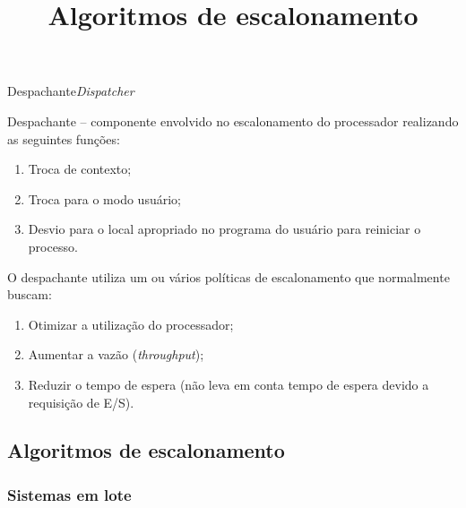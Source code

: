 \begin{frame}{Despachante}{\em Dispatcher}

{ 
Despachante -- componente envolvido no escalonamento do processador
realizando as seguintes funções:
\begin{enumerate}
 \item Troca de contexto;
\item Troca para o modo usuário;
\item Desvio para o local apropriado no programa do usuário para
  reiniciar o processo.
\end{enumerate}
}

O despachante utiliza um ou vários \alert{políticas de escalonamento}
que normalmente buscam:

\begin{enumerate}
\item Otimizar a utilização do processador;
\item Aumentar a vazão ({\em throughput});
\item Reduzir o tempo de espera (não leva em conta tempo de espera
  devido a requisição de E/S).
\end{enumerate}

  
\end{frame}

\def\thetitle{Algoritmos de escalonamento}
\title{\thetitle}
\frame{\date{}\author{}\titlepage}

\subsection{\thetitle}

\subsubsection{Sistemas em lote}
\label{subsection:batch}

\def\colorone{green!40!black}
\def\colortwo{red!50!black}
\def\colorthree{blue}

